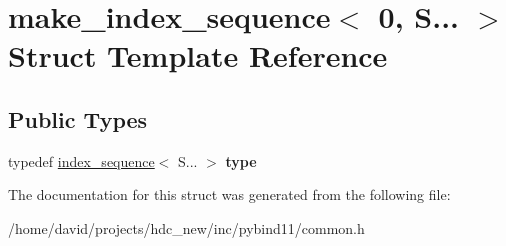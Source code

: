 \hypertarget{structmake__index__sequence_3_010_00_01_s_8_8_8_01_4}{}\section{make\+\_\+index\+\_\+sequence$<$ 0, S... $>$ Struct Template Reference}
\label{structmake__index__sequence_3_010_00_01_s_8_8_8_01_4}
\subsection*{Public Types}
\begin{DoxyCompactItemize}
\item 
typedef \hyperlink{structindex__sequence}{index\+\_\+sequence}$<$ S... $>$ {\bfseries type}\hypertarget{structmake__index__sequence_3_010_00_01_s_8_8_8_01_4_a5da0cef9d46401764ca49e374db6726a}{}\label{structmake__index__sequence_3_010_00_01_s_8_8_8_01_4_a5da0cef9d46401764ca49e374db6726a}

\end{DoxyCompactItemize}


The documentation for this struct was generated from the following file\+:\begin{DoxyCompactItemize}
\item 
/home/david/projects/hdc\+\_\+new/inc/pybind11/common.\+h\end{DoxyCompactItemize}
